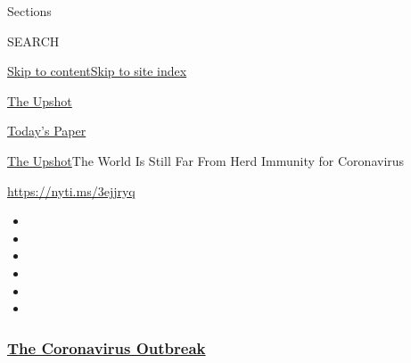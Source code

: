 Sections

SEARCH

\protect\hyperlink{site-content}{Skip to
content}\protect\hyperlink{site-index}{Skip to site index}

\href{https://www.nytimes3xbfgragh.onion/section/upshot}{The Upshot}

\href{https://myaccount.nytimes3xbfgragh.onion/auth/login?response_type=cookie\&client_id=vi}{}

\href{https://www.nytimes3xbfgragh.onion/section/todayspaper}{Today's
Paper}

\href{/section/upshot}{The Upshot}\textbar{}The World Is Still Far From
Herd Immunity for Coronavirus

\url{https://nyti.ms/3ejjryq}

\begin{itemize}
\item
\item
\item
\item
\item
\item
\end{itemize}

\hypertarget{the-coronavirus-outbreak}{%
\subsubsection{\texorpdfstring{\href{https://www.nytimes3xbfgragh.onion/news-event/coronavirus?name=styln-coronavirus-national\&region=TOP_BANNER\&variant=undefined\&block=storyline_menu_recirc\&action=click\&pgtype=Interactive\&impression_id=82050880-e39d-11ea-8096-716e66d3d197}{The
Coronavirus
Outbreak}}{The Coronavirus Outbreak}}\label{the-coronavirus-outbreak}}

